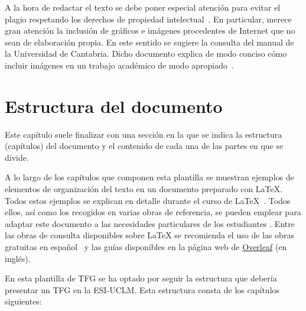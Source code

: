 A la hora de redactar el texto se debe poner especial atención para evitar el plagio respetando los derechos de propiedad intelectual~\cite{uc3m21}. En particular, merece gran atención la inclusión de gráficos e imágenes procedentes de Internet que no sean de elaboración propia. En este sentido se sugiere la consulta del manual de la Universidad de Cantabria. Dicho documento explica de modo conciso cómo incluir imágenes en un trabajo académico de modo apropiado~\cite{unican18}.



\section{Estructura del documento}
Este capítulo suele finalizar con una sección en la que se indica la estructura (capítulos) del documento y el contenido de cada una de las partes en que se divide. 

A lo largo de los capítulos que componen esta plantilla se muestran ejemplos de elementos de organización del texto en un documento preparado con \LaTeX{}. Todos estos ejemplos se explican en detalle durante el curso de \LaTeX{}~\cite{salido10}. Todos ellos, así como los recogidos en varias obras de referencia, se pueden emplear para adaptar este documento a las necesidades particulares de los estudiantes \cite{lamport94,grat99,cascales03,mittelbach04,grat07,goos07,wikibookLaTex10}. Entre las obras de consulta disponibles sobre \LaTeX{} se recomienda el uso de las obras gratuitas en español~\cite{oetiker14,borbon21} y las guías disponibles en la página web de \href{https://es.overleaf.com/learn}{Overleaf} (en inglés).

En esta plantilla de TFG se ha optado por seguir la estructura que debería presentar un TFG en la \mbox{ESI-UCLM}. Esta estructura consta de los capítulos siguientes:

